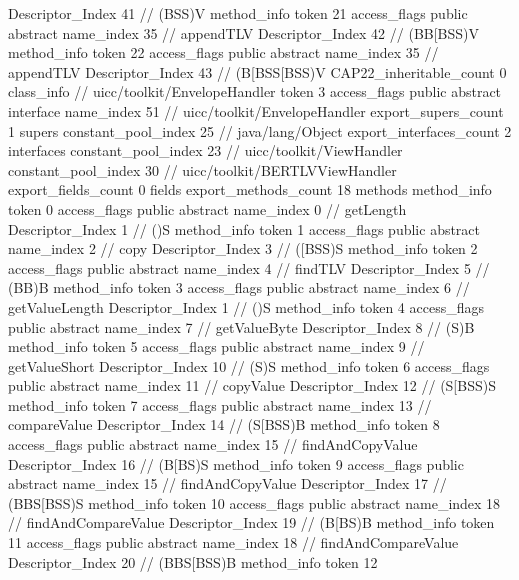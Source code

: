 {{{{{					Descriptor_Index	41		// (BSS)V
				}
				method_info {
					token	21
					access_flags	public abstract
					name_index	35		// appendTLV
					Descriptor_Index	42		// (BB[BSS)V
				}
				method_info {
					token	22
					access_flags	public abstract
					name_index	35		// appendTLV
					Descriptor_Index	43		// (B[BSS[BSS)V
				}
			}
			CAP22_inheritable_count	0
		}
		class_info {		// uicc/toolkit/EnvelopeHandler
			token	3
			access_flags	public abstract interface
			name_index	51		// uicc/toolkit/EnvelopeHandler
			export_supers_count	1
			supers {
				constant_pool_index	25		// java/lang/Object
			}
			export_interfaces_count	2
			interfaces {
				constant_pool_index	23		// uicc/toolkit/ViewHandler
				constant_pool_index	30		// uicc/toolkit/BERTLVViewHandler
			}
			export_fields_count	0
			fields {
			}
			export_methods_count	18
			methods {
				method_info {
					token	0
					access_flags	public abstract
					name_index	0		// getLength
					Descriptor_Index	1		// ()S
				}
				method_info {
					token	1
					access_flags	public abstract
					name_index	2		// copy
					Descriptor_Index	3		// ([BSS)S
				}
				method_info {
					token	2
					access_flags	public abstract
					name_index	4		// findTLV
					Descriptor_Index	5		// (BB)B
				}
				method_info {
					token	3
					access_flags	public abstract
					name_index	6		// getValueLength
					Descriptor_Index	1		// ()S
				}
				method_info {
					token	4
					access_flags	public abstract
					name_index	7		// getValueByte
					Descriptor_Index	8		// (S)B
				}
				method_info {
					token	5
					access_flags	public abstract
					name_index	9		// getValueShort
					Descriptor_Index	10		// (S)S
				}
				method_info {
					token	6
					access_flags	public abstract
					name_index	11		// copyValue
					Descriptor_Index	12		// (S[BSS)S
				}
				method_info {
					token	7
					access_flags	public abstract
					name_index	13		// compareValue
					Descriptor_Index	14		// (S[BSS)B
				}
				method_info {
					token	8
					access_flags	public abstract
					name_index	15		// findAndCopyValue
					Descriptor_Index	16		// (B[BS)S
				}
				method_info {
					token	9
					access_flags	public abstract
					name_index	15		// findAndCopyValue
					Descriptor_Index	17		// (BBS[BSS)S
				}
				method_info {
					token	10
					access_flags	public abstract
					name_index	18		// findAndCompareValue
					Descriptor_Index	19		// (B[BS)B
				}
				method_info {
					token	11
					access_flags	public abstract
					name_index	18		// findAndCompareValue
					Descriptor_Index	20		// (BBS[BSS)B
				}
				method_info {
					token	12
}}}}}
